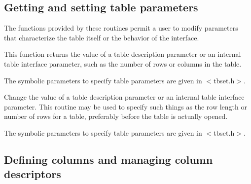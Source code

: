 \callseqtable

\subsection{Getting and setting table parameters}

The functions provided by these routines permit a user to modify parameters
that characterize the table itself or the behavior of the interface.

\begin{callseq}
\end{callseq}

This function returns the value of a table description parameter or an
internal table interface parameter, such as
the number of rows or columns in the table.

\callseqfcn

The symbolic parameters to specify table parameters are given in $<$tbset.h$>$.

\begin{callseq}
\end{callseq}

Change the value of a table description parameter or an internal table
interface parameter.  This routine may be used to specify such things as
the row length or number of rows for a table, preferably before the table
is actually opened.

\callseqtable

The symbolic parameters to specify table parameters are given in $<$tbset.h$>$.

\subsection{Defining columns and managing column descriptors}

\begin{callseq}
\end{callseq}

